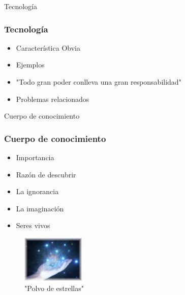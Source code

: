 \documentclass{beamer}
\begin{document}
\begin{frame}{Tecnología}
\frametitle{Tecnología}
\begin{itemize}
    \item Característica Obvia
    \item Ejemplos
    \item "Todo gran poder conlleva una gran responsabilidad"
    \item Problemas relacionados
\end{itemize}
    
\end{frame}

\begin{frame}{Cuerpo de conocimiento}
\frametitle{Cuerpo de conocimiento}
 \begin{multicols}{2}
\begin{itemize}
    \item Importancia 
    \item Razón de descubrir 
    \item La ignorancia
    \item La imaginación 
    \item Seres vivos
\end{itemize}


\begin{figure}[htp]
        \centering
        \includegraphics[width=3cm]{images/dust}
        \caption{"Polvo de estrellas"}
    \end{figure}

\end{multicols}
\end{frame}

\end{document}
